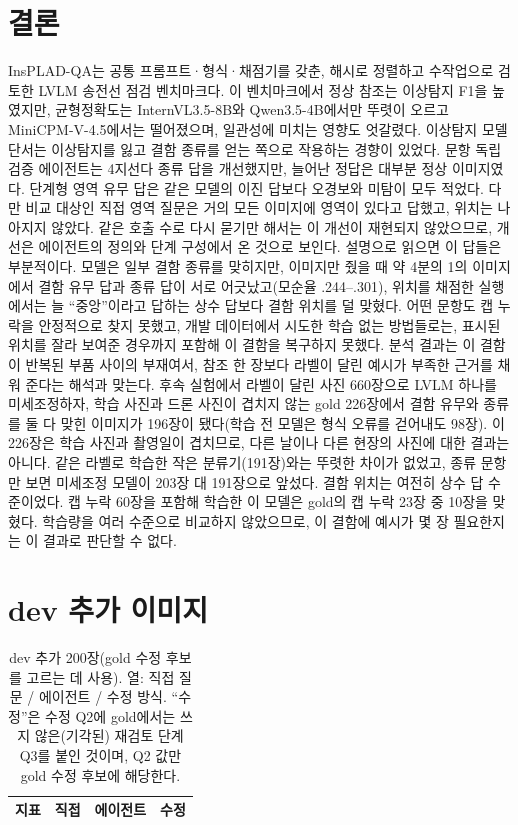 \documentclass[11pt]{article}
\begin{document}
\section{결론}
InsPLAD-QA는 공통 프롬프트·형식·채점기를 갖춘, 해시로 정렬하고 수작업으로 검토한 LVLM 송전선 점검 벤치마크다. 이 벤치마크에서 정상 참조는 이상탐지 F1을 높였지만, 균형정확도는 InternVL3.5-8B와 Qwen3.5-4B에서만 뚜렷이 오르고 MiniCPM-V-4.5에서는 떨어졌으며, 일관성에 미치는 영향도 엇갈렸다. 이상탐지 모델 단서는 이상탐지를 잃고 결함 종류를 얻는 쪽으로 작용하는 경향이 있었다. 문항 독립 검증 에이전트는 4지선다 종류 답을 개선했지만, 늘어난 정답은 대부분 정상 이미지였다. 단계형 영역 유무 답은 같은 모델의 이진 답보다 오경보와 미탐이 모두 적었다. 다만 비교 대상인 직접 영역 질문은 거의 모든 이미지에 영역이 있다고 답했고, 위치는 나아지지 않았다. 같은 호출 수로 다시 묻기만 해서는 이 개선이 재현되지 않았으므로, 개선은 에이전트의 정의와 단계 구성에서 온 것으로 보인다. 설명으로 읽으면 이 답들은 부분적이다. 모델은 일부 결함 종류를 맞히지만, 이미지만 줬을 때 약 4분의 1의 이미지에서 결함 유무 답과 종류 답이 서로 어긋났고(모순율 .244--.301), 위치를 채점한 실행에서는 늘 ``중앙''이라고 답하는 상수 답보다 결함 위치를 덜 맞혔다. 어떤 문항도 캡 누락을 안정적으로 찾지 못했고, 개발 데이터에서 시도한 학습 없는 방법들로는, 표시된 위치를 잘라 보여준 경우까지 포함해 이 결함을 복구하지 못했다. 분석 결과는 이 결함이 반복된 부품 사이의 부재여서, 참조 한 장보다 라벨이 달린 예시가 부족한 근거를 채워 준다는 해석과 맞는다. 후속 실험에서 라벨이 달린 사진 660장으로 LVLM 하나를 미세조정하자, 학습 사진과 드론 사진이 겹치지 않는 gold 226장에서 결함 유무와 종류를 둘 다 맞힌 이미지가 196장이 됐다(학습 전 모델은 형식 오류를 걷어내도 98장). 이 226장은 학습 사진과 촬영일이 겹치므로, 다른 날이나 다른 현장의 사진에 대한 결과는 아니다. 같은 라벨로 학습한 작은 분류기(191장)와는 뚜렷한 차이가 없었고, 종류 문항만 보면 미세조정 모델이 203장 대 191장으로 앞섰다. 결함 위치는 여전히 상수 답 수준이었다. 캡 누락 60장을 포함해 학습한 이 모델은 gold의 캡 누락 23장 중 10장을 맞혔다. 학습량을 여러 수준으로 비교하지 않았으므로, 이 결함에 예시가 몇 장 필요한지는 이 결과로 판단할 수 없다.




\appendix
\section{dev 추가 이미지}
\begin{table}[h]
\centering
\caption{dev 추가 200장(gold 수정 후보를 고르는 데 사용). 열: 직접 질문 / 에이전트 / 수정 방식. ``수정''은 수정 Q2에 gold에서는 쓰지 않은(기각된) 재검토 단계 Q3를 붙인 것이며, Q2 값만 gold 수정 후보에 해당한다.}
\label{tab:dev}
\begin{tabular}{lrrr}
\toprule
지표 & 직접 & 에이전트 & 수정 \\
\midrule

\bottomrule
\end{tabular}
\end{table}
\end{document}
